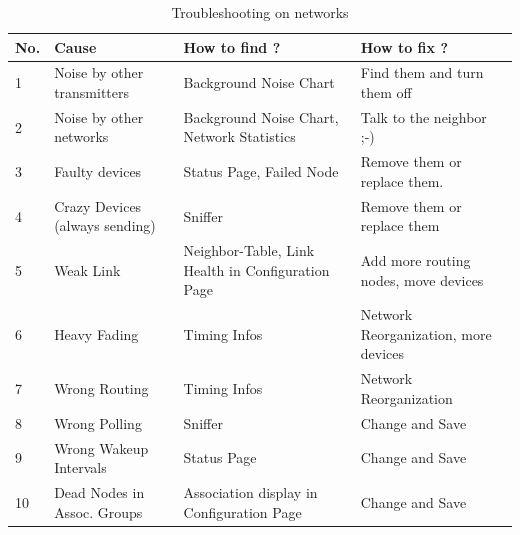 \begin{table}
\begin{tabular}{|p{}|p{}|p{}|p{}|}
\hline
No.	&Cause	& How to find ?&	How to fix ?\\
\hline
1	&Noise by other transmitters	&Background Noise Chart	&Find them and turn them off\\
\hline
2	&Noise by other \zwave networks	&Background Noise Chart, Network Statistics	&Talk to the neighbor ;-)\\
\hline
3	&Faulty devices					&Status Page, Failed Node	&Remove them or replace them.\\
\hline
4	&Crazy Devices (always sending)	&Sniffer	&Remove them or replace them\\
\hline
5	&Weak Link						&Neighbor-Table, Link Health in Configuration Page	&Add more routing nodes, move devices\\
\hline
6	&Heavy Fading 					&Timing Infos&Network Reorganization, more devices\\
\hline
7	&Wrong Routing					&Timing Infos &Network Reorganization \\
\hline
8	&Wrong Polling					&Sniffer	&Change and Save \\
\hline
9	&Wrong Wakeup Intervals			&Status Page	&Change and Save \\
\hline
10	&Dead Nodes in Assoc. Groups	&Association display in Configuration Page	&Change and Save \\
\hline
\end{tabular}
\caption{Troubleshooting on \zwave networks}
\label{c5:citsummary}
\end{table}	

